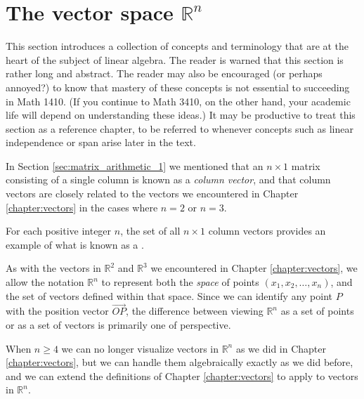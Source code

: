 \section{The vector space $\mathbb{R}^n$}\label{sec:Rn}
This section introduces a collection of concepts and terminology that are at the heart of the subject of linear algebra. The reader is warned that this section is rather long and abstract. The reader may also be encouraged (or perhaps annoyed?) to know that mastery of these concepts is not essential to succeeding in Math 1410. (If you continue to Math 3410, on the other hand, your academic life will depend on understanding these ideas.) It may be productive to treat this section as a reference chapter, to be referred to whenever concepts such as linear independence or span arise later in the text.

In Section \ref{sec:matrix_arithmetic_1} we mentioned that an $n\times 1$ matrix consisting of a single column is known as a \textit{column vector}, and that column vectors are closely related to the vectors we encountered in Chapter \ref{chapter:vectors} in the cases where $n=2$ or $n=3$. 

For each positive integer $n$, the set of all $n\times 1$ column vectors provides an example of what is known as a . 




As with the vectors in $\mathbb{R}^2$ and $\mathbb{R}^3$ we encountered in Chapter \ref{chapter:vectors}, we allow the notation $\mathbb{R}^n$ to represent both the \textit{space} of points $(x_1,x_2, \ldots, x_n)$, and the set of vectors defined within that space. Since we can identify any point $P$ with the position vector $\overrightarrow{OP}$, the difference between viewing $\mathbb{R}^n$ as a set of points or as a set of vectors is primarily one of perspective.

When $n\geq 4$ we can no longer visualize vectors in $\mathbb{R}^n$ as we did in Chapter \ref{chapter:vectors}, but we can handle them algebraically exactly as we did before, and we can extend the definitions of Chapter \ref{chapter:vectors} to apply to vectors in $\mathbb{R}^n$.

